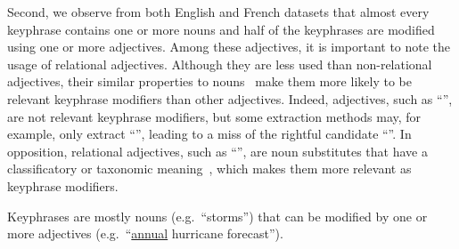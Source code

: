     Second, we observe from both English and French datasets that almost every
    keyphrase contains one or more nouns and half of the keyphrases are modified
    using one or more adjectives.
    Among these adjectives, it is important to note the usage of relational
    adjectives. Although they are less used than non-relational adjectives,
    their similar properties to
    nouns~\cite{bally1944linguistiquegeneraleetlinguistiquefrancaise} make them
    more likely to be relevant keyphrase modifiers than other adjectives.
    Indeed, adjectives, such as ``'', are not relevant keyphrase
    modifiers, but some extraction methods may, for example, only extract
    ``'', leading to a miss of the rightful candidate
    ``''. In opposition, relational adjectives, such as
    ``'', are noun substitutes that have a classificatory or
    taxonomic meaning~\cite{mcnally2004relationaladjectives}, which makes them
    more relevant as keyphrase modifiers.

    \begin{property}\label{prop:noun_phrases}
      Keyphrases are mostly nouns (e.g.~``storms'') that can be modified by one
      or more adjectives (e.g.~``\underline{annual} hurricane forecast'').
    \end{property}

